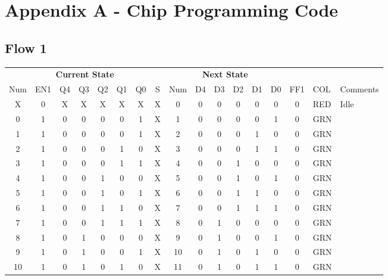 \newpage
\section{Appendix A - Chip Programming Code}
\subsection{Flow 1}
\label{subsec:F1cpc}

\begin{table*}
\begin{tabularx}{\linewidth}{ c c c c c c c c | c c c c c c | c l l}
  \multicolumn{8}{c|}{\textbf{Current State}} & \multicolumn{6}{c|}{\textbf{Next State}} &     &           & \\
  Num & EN1 & Q4 & Q3 & Q2 & Q1 & Q0 & S      & Num & D4 & D3 & D2 & D1 & D0             & FF1 & COL   & Comments \\ \hline
    X &   0 &  X &  X &  X &  X &  X & X      &   0 &  0 &  0 &  0 &  0 &  0             &   0 & RED & Idle \\
    0 &   1 &  0 &  0 &  0 &  0 &  1 & X      &   1 &  0 &  0 &  0 &  0 &  1             &   0 & GRN & \\
    1 &   1 &  0 &  0 &  0 &  0 &  1 & X      &   2 &  0 &  0 &  0 &  1 &  0             &   0 & GRN & \\
    2 &   1 &  0 &  0 &  0 &  1 &  0 & X      &   3 &  0 &  0 &  0 &  1 &  1             &   0 & GRN & \\
    3 &   1 &  0 &  0 &  0 &  1 &  1 & X      &   4 &  0 &  0 &  1 &  0 &  0             &   0 & GRN & \\
    4 &   1 &  0 &  0 &  1 &  0 &  0 & X      &   5 &  0 &  0 &  1 &  0 &  1             &   0 & GRN & \\
    5 &   1 &  0 &  0 &  1 &  0 &  1 & X      &   6 &  0 &  0 &  1 &  1 &  0             &   0 & GRN & \\
    6 &   1 &  0 &  0 &  1 &  1 &  0 & X      &   7 &  0 &  0 &  1 &  1 &  1             &   0 & GRN & \\
    7 &   1 &  0 &  0 &  1 &  1 &  1 & X      &   8 &  0 &  1 &  0 &  0 &  0             &   0 & GRN & \\
    8 &   1 &  0 &  1 &  0 &  0 &  0 & X      &   9 &  0 &  1 &  0 &  0 &  1             &   0 & GRN & \\
    9 &   1 &  0 &  1 &  0 &  0 &  1 & X      &  10 &  0 &  1 &  0 &  1 &  0             &   0 & GRN & \\
   10 &   1 &  0 &  1 &  0 &  1 &  0 & X      &  11 &  0 &  1 &  0 &  1 &  1             &   0 & GRN & \\

\end{tabularx}
\end{table*}
